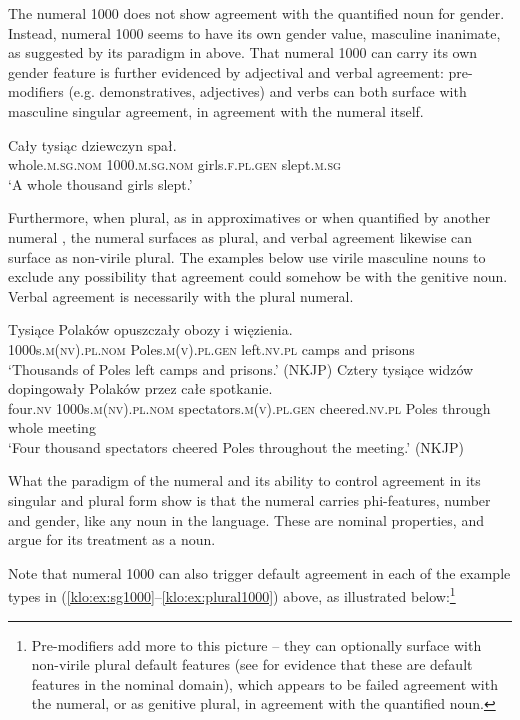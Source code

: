 \documentclass[output=paper]{langscibook}
\begin{document}
\noindent The numeral 1000 does not show agreement with the quantified noun for gender. Instead, numeral 1000 seems to have its own gender value, masculine inanimate, as suggested by its paradigm in  above. That numeral 1000 can carry its own gender feature is further evidenced by adjectival and verbal agreement: pre-modifiers (e.g. demonstratives, adjectives) and verbs can both surface with masculine singular agreement, in agreement with the numeral itself.

\ea\label{klo:ex:sg1000}
\gll Cały tysiąc dziewczyn spał.\\
whole.\textsc{m.sg.nom} 1000.\textsc{m.sg.nom} girls.\textsc{f.pl.gen} slept.\textsc{m.sg}\\
\glt `A whole thousand girls slept.'
\z

\noindent Furthermore, when plural, as in approximatives  or when quantified by another numeral , the numeral surfaces as plural, and verbal agreement likewise can surface as non-virile plural. The examples below use virile masculine nouns to exclude any possibility that agreement could somehow be with the genitive noun. Verbal agreement is necessarily with the plural numeral.

\ea \label{klo:ex:plural1000}
\ea \label{klo:ex:approx1000}
\gll Tysiące Polaków opuszczały obozy i więzienia.\\
1000s.\textsc{m(nv).pl.nom} Poles.\textsc{m(v).pl.gen} left.\textsc{nv.pl} camps and prisons\\
\glt `Thousands of Poles left camps and prisons.' \hfill (NKJP)
\ex  \gll Cztery tysiące widzów dopingowały Polaków przez całe spotkanie. \\
four.\textsc{nv} 1000s.\textsc{m(nv).pl.nom} spectators.\textsc{m(v).pl.gen} cheered.\textsc{nv.pl} Poles through whole meeting\\
\glt `Four thousand spectators cheered Poles throughout the meeting.' \label{klo:ex:quant1000} \hfill (NKJP)
\z \z %

\noindent What the paradigm of the numeral and its ability to control agreement in its singular and plural form show is that the numeral carries phi-features, number and gender, like any noun in the language. These are nominal properties, and argue for its treatment as a noun. 

Note that numeral 1000 can also trigger default agreement in each of the example types in (\ref{klo:ex:sg1000}--\ref{klo:ex:plural1000}) above, as illustrated below:\footnote{Pre-modifiers add more to this picture -- they can optionally surface with non-virile plural default features (see \citealt[121--122]{klockmann2017semiLex} for evidence that these are default features in the nominal domain), which appears to be failed agreement with the numeral, or as genitive plural, in agreement with the quantified noun.}
\end{document}
